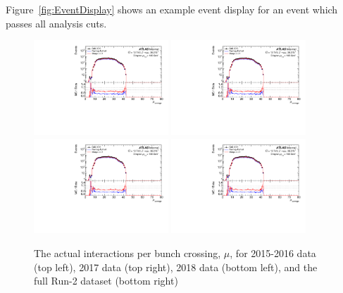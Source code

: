 Figure~\ref{fig:EventDisplay} shows an example event display for an event which passes all analysis cuts.

\begin{figure}[h!]
  \centering
  \includegraphics[page=5,width=0.45\textwidth]{figures/ZjetOmnifoldMCDataComp.pdf}
  \includegraphics[page=6,width=0.45\textwidth]{figures/ZjetOmnifoldMCDataComp.pdf} \\
  \includegraphics[page=7,width=0.45\textwidth]{figures/ZjetOmnifoldMCDataComp.pdf}
  \includegraphics[page=8,width=0.45\textwidth]{figures/ZjetOmnifoldMCDataComp.pdf}
  \caption{The actual interactions per bunch crossing, $\mu$, for 2015-2016 data (top left), 2017 data (top right), 2018 data (bottom left), and the full Run-2 dataset (bottom right)}
  \label{fig:MuActual}
\end{figure}


